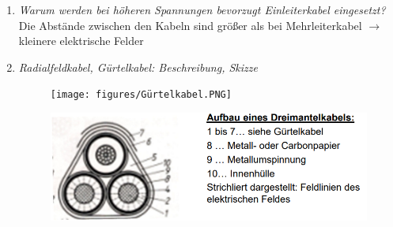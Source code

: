 \documentclass[12pt]{article}
\begin{document}
\begin{enumerate}
    \item \textit{Warum werden bei höheren Spannungen bevorzugt Einleiterkabel eingesetzt?}\\
    Die Abstände zwischen den Kabeln sind größer als bei Mehrleiterkabel $\rightarrow$ kleinere elektrische Felder
    \clearpage
    \item \textit{Radialfeldkabel, Gürtelkabel: Beschreibung, Skizze}\\
    \begin{figure}[h]
        \texttt{[image: figures/Gürtelkabel.PNG]}
        \centering
    \end{figure}

    \begin{figure}[h]
        \includegraphics[width=\textwidth]{figures/Radialfeldkabel.PNG}
        \centering
    \end{figure}


\end{enumerate}
\end{document}
